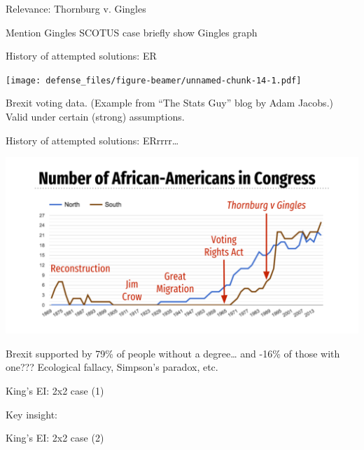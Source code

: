\documentclass[
  ignorenonframetext,
]{beamer}
\begin{document}
\begin{frame}{Relevance: Thornburg v. Gingles}
\protect\hypertarget{relevance-thornburg-v.-gingles}{}

Mention Gingles SCOTUS case briefly show Gingles graph

\end{frame}

\begin{frame}{History of attempted solutions: ER}
\protect\hypertarget{history-of-attempted-solutions-er}{}

\texttt{[image: defense\_files/figure-beamer/unnamed-chunk-14-1.pdf]}

Brexit voting data. (Example from ``The Stats Guy'' blog by Adam
Jacobs.) Valid under certain (strong) assumptions.

\end{frame}

\begin{frame}{History of attempted solutions: ERrrrr\ldots{}}
\protect\hypertarget{history-of-attempted-solutions-errrrr}{}

\includegraphics{defense_files/figure-beamer/unnamed-chunk-15-1.pdf}

Brexit supported by 79\% of people without a degree\ldots{} and -16\% of
those with one??? Ecological fallacy, Simpson's paradox, etc.

\end{frame}

\begin{frame}{King's EI: 2x2 case (1)}
\protect\hypertarget{kings-ei-2x2-case-1}{}

Key insight:

\end{frame}

\begin{frame}{King's EI: 2x2 case (2)}
\protect\hypertarget{kings-ei-2x2-case-2}{}

\end{frame}
\end{document}
